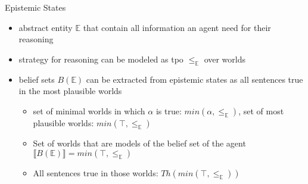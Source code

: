 \documentclass[12pt, notheorems]{beamer}
\newcommand{\modelsOf}[1]{\llbracket #1 \rrbracket}
\theoremstyle{definition}
\theoremstyle{example}
\theoremstyle{plain}
\begin{document}
\begin{frame}{Epistemic States}
    \begin{itemize}
        \item abstract entity $\mathbb{E}$ that contain all information an agent need for their reasoning \cite{Darwiche1997}
        \item strategy for reasoning can be modeled as tpo $\leq_{\mathbb{E}}$ over worlds
        \item belief sets $B(\mathbb{E})$ can be extracted from epistemic states as all sentences true in the most plausible worlds
              \begin{itemize}
                  \item set of minimal worlds in which $\alpha$ is true: $min(\alpha, \leq_{\mathbb{E}})$, set of most plausible worlds:  $min(\top, \leq_{\mathbb{E}})$
                  \item Set of worlds that are models of the belief set of the agent $\modelsOf{B(\mathbb{E})} = min(\top, \leq_{\mathbb{E}})$
                  \item All sentences true in those worlds: $Th(min(\top, \leq_{\mathbb{E}}))$
              \end{itemize}
    \end{itemize}
\end{frame}
\end{document}
